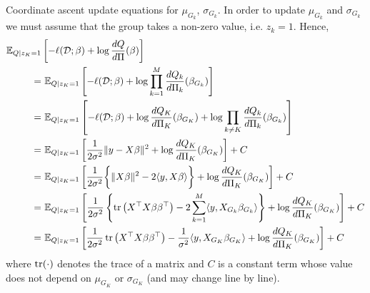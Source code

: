\documentclass[12pt]{article}
\begin{document}
Coordinate ascent update equations for $\mu_{G_k}$, $\sigma_{G_k}$. In order to update $\mu_{G_k}$ and $\sigma_{G_k}$ we must assume that the group takes a non-zero value, i.e. $z_k =1$. Hence, %
{\allowdisplaybreaks
\begin{align}
\mathbb{E}_{Q  | z_K = 1} & \left[ 
    - \ell(\mathcal{D}; \beta) + \log \frac{dQ}{d\Pi}(\beta) 
\right]  \nonumber \\
= &\
    \mathbb{E}_{Q | z_K = 1} \left[ 
	- \ell(\mathcal{D}; \beta) + \log \prod_{k=1}^M \frac{dQ_k}{d\Pi_k}(\beta_{G_k})
    \right] \nonumber \\
= &\
    \mathbb{E}_{Q | z_K = 1} \left[ 
	- \ell(\mathcal{D}; \beta) 
	+ \log \frac{dQ_K}{d\Pi_K}(\beta_{G_K})
	+ \log \prod_{k \neq K} \frac{dQ_k}{d\Pi_k}(\beta_{G_k})
    \right] \nonumber \\
= &\
    \mathbb{E}_{Q | z_K = 1} \left[ 
	\frac{1}{2\sigma^2} \| y - X \beta \|^2
	+ \log \frac{dQ_K}{d\Pi_K}(\beta_{G_K})
    \right] + C \nonumber \\
= &\
    \mathbb{E}_{Q | z_K = 1} \left[ 
	\frac{1}{2\sigma^2} \bigg\{ 
	    \| X \beta \|^2 - 2 \langle y, X\beta \rangle 
	\bigg\}
	+ \log \frac{dQ_K}{d\Pi_K}(\beta_{G_K})
    \right] + C \nonumber \\
= &\
    \mathbb{E}_{Q | z_K = 1} \left[ 
	\frac{1}{2\sigma^2} \left\{ 
	    \operatorname{tr} \left( X^\top X \beta \beta^\top \right) 
	    - 2 \sum_{k=1}^M \langle y, X_{G_k} \beta_{G_k} \rangle 
	\right\}
	+ \log \frac{dQ_K}{d\Pi_K}(\beta_{G_K})
    \right] + C \nonumber \\
= &\
    \mathbb{E}_{Q | z_K = 1} \left[ 
	\frac{1}{2\sigma^2} \operatorname{tr} \left( X^\top X \beta \beta^\top \right) 
	- \frac{1}{\sigma^2} \langle y, X_{G_K} \beta_{G_K} \rangle 
	+ \log \frac{dQ_K}{d\Pi_K}(\beta_{G_K})
    \right] + C \label{eq:mu_sigma_1}
\end{align}
} %
where $\operatorname{tr}(\cdot)$ denotes the trace of a matrix and $C$ is a constant term whose value does not depend on $\mu_{G_K}$ or $\sigma_{G_K}$ (and may change line by line).
\end{document}
